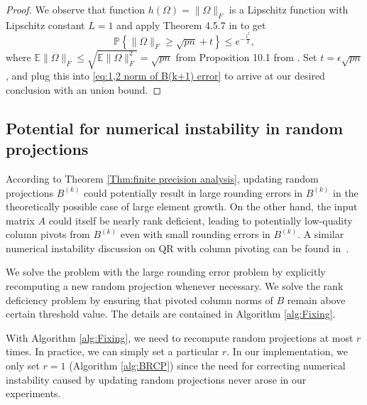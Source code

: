 \documentclass[11pt]{article}
\begin{document}
\begin{proof}
We observe that function $h(\Omega) = \|\Omega \|_F$ is a Lipschitz function with Lipschitz constant $L = 1$ and apply Theorem 4.5.7 in \cite{bogachev1998gaussian} to get
\begin{equation*}
    \mathbb{P}\left\{ \|\Omega \|_F \ge \sqrt{pn} + t \right\} \le e^{-\frac{t^2}{2}},
\end{equation*}
where $\mathbb{E}\|\Omega\|_F \le \sqrt{\mathbb{E}\|\Omega\|_F^2} = \sqrt{pn}$ from Proposition 10.1 from \cite{halko2011finding}. Set $t = \epsilon \sqrt{pn}$, and plug this into \eqref{eq:1,2 norm of B(k+1) error} to arrive at our desired conclusion with an union bound.
\end{proof}

\subsection{Potential for numerical instability in random projections}

According to Theorem \ref{Thm:finite precision analysis}, updating random projections $B^{(k)}$ could potentially result in large rounding errors in $B^{(k)}$ in the theoretically possible case of large element growth. On the other hand, the input matrix $A$ could itself be nearly rank deficient, leading to potentially low-quality column pivots from $B^{(k)}$ even with small rounding errors in $B^{(k)}$. A similar numerical instability discussion on QR with column pivoting can be found in~\cite{drmavc2008failure}. 

We solve the problem with the large rounding error problem by explicitly recomputing a new random projection whenever necessary. We solve the rank deficiency problem by ensuring that pivoted column norms of $B$ remain above certain threshold value. The details are contained in Algorithm \ref{alg:Fixing}. 

With Algorithm \ref{alg:Fixing}, we need to recompute random projections at most $r$ times. In practice, we can simply set a particular $r$. In our implementation, we only set $r = 1$ (Algorithm \ref{alg:BRCP}) since the need for correcting numerical instability caused by updating random projections never arose in our experiments. 
\end{document}
